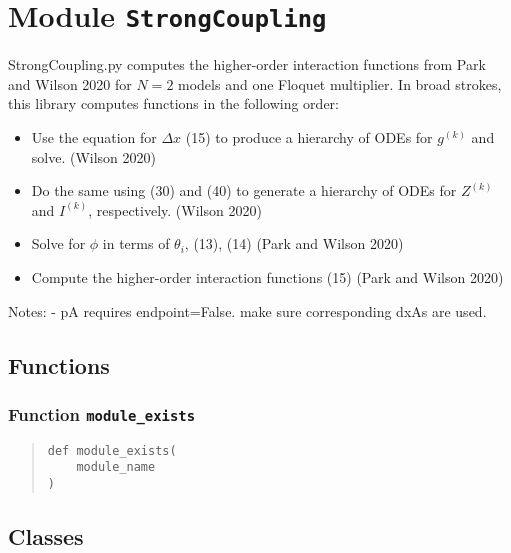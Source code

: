 \documentclass[english,a4paper,oneside]{article}
\providecommand{\tightlist}{%
  \setlength{\itemsep}{0pt}\setlength{\parskip}{0pt}}
\begin{document}
\hypertarget{StrongCoupling}{%
\section{\texorpdfstring{Module
\texttt{StrongCoupling}}{Module StrongCoupling}}\label{StrongCoupling}}

StrongCoupling.py computes the higher-order interaction functions from
Park and Wilson 2020 for \(N=2\) models and one Floquet multiplier. In
broad strokes, this library computes functions in the following order:

\begin{itemize}
\tightlist
\item
  Use the equation for \(\Delta x\) (15) to produce a hierarchy of ODEs
  for \(g^{(k)}\) and solve. (Wilson 2020)
\item
  Do the same using (30) and (40) to generate a hierarchy of ODEs for
  \(Z^{(k)}\) and \(I^{(k)}\), respectively. (Wilson 2020)
\item
  Solve for \(\phi\) in terms of \(\theta_i\), (13), (14) (Park and
  Wilson 2020)
\item
  Compute the higher-order interaction functions (15) (Park and Wilson
  2020)
\end{itemize}

Notes: - pA requires endpoint=False. make sure corresponding dxAs are
used.

\hypertarget{functions}{%
\subsection{Functions}\label{functions}}

\hypertarget{StrongCoupling.module_exists}{%
\subsubsection{\texorpdfstring{Function
\texttt{module\_exists}}{Function module\_exists}}\label{StrongCoupling.module_exists}}

\begin{quote}
\begin{verbatim}
def module_exists(
    module_name
)
\end{verbatim}
\end{quote}

\hypertarget{classes}{%
\subsection{Classes}\label{classes}}
\end{document}
